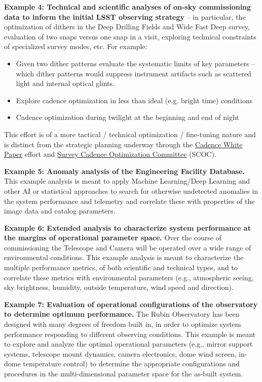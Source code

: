 \documentclass[SE,authoryear,toc]{lsstdoc}
\begin{document}
\textbf{Example 4: Technical and scientific analyses of on-sky commissioning data to inform the initial LSST observing strategy} -- in particular, the optimization of dithers in the Deep Drilling Fields and Wide Fast Deep survey, evaluation of two snaps versus one snap in a visit, exploring technical constraints of specialized survey modes, etc.  For example:
\begin{itemize}
\item Given two dither patterns evaluate the systematic limits of key parameters -- which dither patterns would suppress instrument artifacts such as scattered light and internal optical glints.
\item Explore cadence optimization in less than ideal (e.g. bright time) conditions
\item Cadence optimization during twilight at the beginning and end of night
\end{itemize}
This effort is of a more tactical / technical optimization / fine-tuning nature and is distinct from the strategic planning underway through the \href{https://www.lsst.org/content/survey-cadence-notes-2021}{Cadence White Paper} effort and \href{https://www.lsst.org/content/charge-survey-cadence-optimization-committee-scoc}{Survey Cadence Optimization Committee} (SCOC).

\textbf{Example 5: Anomaly analysis of the Engineering Facility Database.} This example analysis is meant to apply Machine Learning/Deep Learning and other AI or statistical approaches to search for otherwise undetected anomalies in the system performance and telemetry and correlate these with properties of the image data and catalog parameters.
 
\textbf{Example 6: Extended analysis to characterize system performance at the margins of operational parameter space.} Over the course of commissioning the Telescope and Camera will be operated over a wide range of environmental conditions. This example analysis is meant to characterize the multiple performance metrics, of both scientific and technical types, and to correlate these metrics with environmental parameters (e.g., atmospheric seeing, sky brightness, humidity, outside temperature, wind speed and direction).
 
\textbf{Example 7: Evaluation of operational configurations of the observatory to determine optimum performance.} The Rubin Observatory has been designed with many degrees of freedom built in, in order to optimize system performance responding to different observing conditions. This example is meant to explore and analyze the optimal operational parameters (e.g., mirror support systems, telescope mount dynamics, camera electronics, dome wind screen, in-dome temperature control) to determine the appropriate configurations and procedures in the multi-dimensional parameter space for the as-built system.
\end{document}
